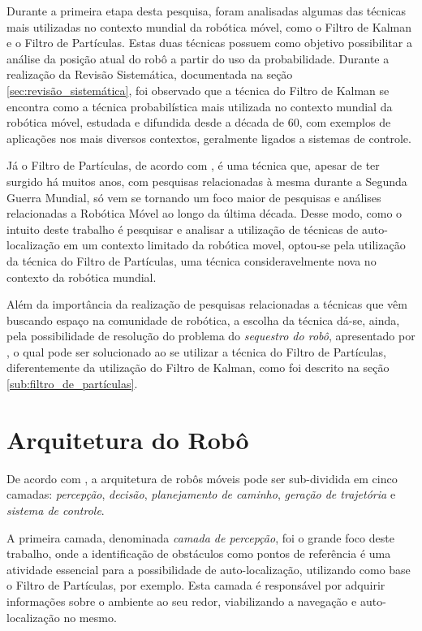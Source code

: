 	Durante a primeira etapa desta pesquisa, foram analisadas algumas das técnicas mais utilizadas no contexto mundial da robótica móvel, como o Filtro de Kalman e
	o Filtro de Partículas. Estas duas técnicas possuem como objetivo possibilitar a análise da posição atual do robô a partir do uso da probabilidade. Durante a realização
	da Revisão Sistemática, documentada na seção \ref{sec:revisão_sistemática}, foi observado que a técnica do Filtro de Kalman se encontra
	como a técnica probabilística mais utilizada no contexto mundial da robótica móvel, estudada e difundida desde a década de 60, com exemplos de aplicações
	nos mais diversos contextos, geralmente ligados a sistemas de controle.

	Já o Filtro de Partículas, de acordo com \cite{sequestro}, é uma técnica que, apesar de ter surgido há muitos anos, com
	pesquisas relacionadas à mesma durante a Segunda Guerra Mundial, só vem se tornando um foco maior de pesquisas e análises relacionadas
	a Robótica Móvel ao longo da última década. Desse modo, como o intuito deste trabalho é pesquisar e analisar a utilização de técnicas de auto-localização em um contexto
	limitado da robótica movel, optou-se pela utilização da técnica do Filtro de Partículas, uma técnica consideravelmente nova no contexto da
	robótica mundial.

	Além da importância da realização de pesquisas relacionadas a técnicas que vêm buscando espaço na comunidade de robótica, a escolha da técnica dá-se, ainda,
	pela possibilidade de resolução do problema do \textit{sequestro do robô}, apresentado por \cite{sequestro}, o qual pode ser solucionado ao se utilizar a técnica do
	Filtro de Partículas, diferentemente da utilização do Filtro de Kalman, como foi descrito na seção \ref{sub:filtro_de_partículas}.

\section{Arquitetura do Robô}

De acordo com \cite{vieira}, a arquitetura de robôs móveis pode ser sub-dividida em cinco camadas: \textit{percepção}, \textit{decisão}, \textit{planejamento de caminho}, \textit{geração de trajetória} e \textit{sistema de controle}.

A primeira camada, denominada \textit{camada de percepção}, foi o grande foco deste trabalho, onde a identificação de obstáculos como pontos de referência é uma atividade essencial para a possibilidade de auto-localização, utilizando como base o Filtro de Partículas, por exemplo. Esta camada é responsável por adquirir informações sobre o ambiente ao seu redor, viabilizando a navegação e auto-localização no mesmo.

